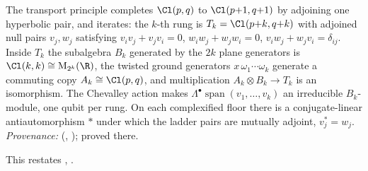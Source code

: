 The transport principle completes $\Cl(p,q)$ to $\Cl(p{+}1, q{+}1)$ by adjoining one hyperbolic pair, and iterates: the $k$-th rung is $T_{k} = \Cl(p{+}k, q{+}k)$ with adjoined null pairs $v_{j}, w_{j}$ satisfying $v_{i}v_{j} + v_{j}v_{i} = 0$, $w_{i}w_{j} + w_{j}w_{i} = 0$, $v_{i}w_{j} + w_{j}v_{i} = \delta_{ij}$. Inside $T_{k}$ the subalgebra $B_{k}$ generated by the $2k$ plane generators is $\Cl(k,k) \cong \mathrm{M}_{2^{k}}(\R)$, the twisted ground generators $x\,\omega_{1}\cdots\omega_{k}$ generate a commuting copy $A_{k} \cong \Cl(p,q)$, and multiplication $A_{k} \otimes B_{k} \to T_{k}$ is an isomorphism. The Chevalley action makes $\Lambda^{\bullet}\operatorname{span}(v_{1}, \ldots, v_{k})$ an irreducible $B_{k}$-module, one qubit per rung. On each complexified floor there is a conjugate-linear antiautomorphism $*$ under which the ladder pairs are mutually adjoint, $v_{j}^{*} = w_{j}$. \emph{Provenance:} \cite[Thms.~3.2, 4.2]{ButlerT3} (, ); proved there.

This restates , .
